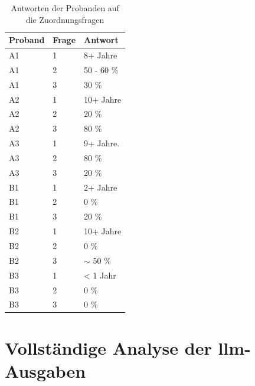 \begin{table}[h]
    \centering
    \caption{Antworten der Probanden auf die Zuordnungsfragen}
    \begin{tabular}{C{2cm} | C{2cm} | L{8cm}}
        \hline
        \textbf{Proband} & \textbf{Frage} & \textbf{Antwort} \\
        \hline
        A1 & 1 & 8+ Jahre \\
        A1 & 2 & 50 - 60 \% \\
        A1 & 3 & 30 \% \\
        \hline
        A2 & 1 & 10+ Jahre \\
        A2 & 2 & 20 \% \\
        A2 & 3 & 80 \% \\
        \hline
        A3 & 1 & 9+ Jahre. \\
        A3 & 2 & 80 \% \\
        A3 & 3 & 20 \% \\
        \hline
        B1 & 1 & 2+ Jahre \\
        B1 & 2 & 0 \% \\
        B1 & 3 & 20 \% \\
        \hline
        B2 & 1 & 10+ Jahre \\
        B2 & 2 & 0 \% \\
        B2 & 3 & $\sim$ 50 \% \\
        \hline
        B3 & 1 & < 1 Jahr \\
        B3 & 2 & 0 \% \\
        B3 & 3 & 0 \% \\
        \hline
    \end{tabular}
\end{table}

\clearpage

\section*{Vollständige Analyse der \gls{llm}-Ausgaben}
\label{sec:appendix-analysis}

